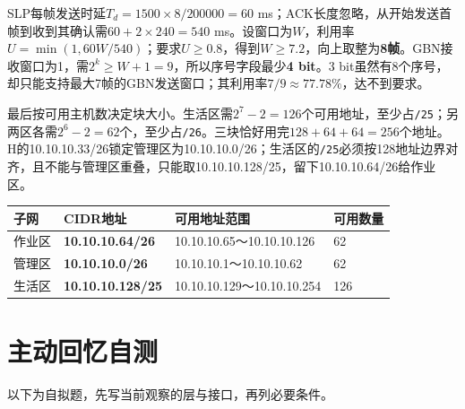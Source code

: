 SLP每帧发送时延\(T_d=1500\times8/200000=60\) ms；ACK长度忽略，从开始发送首帧到收到其确认需\(60+2\times240=540\) ms。设窗口为\(W\)，利用率\(U=\min(1,60W/540)\)；要求\(U\ge0.8\)，得到\(W\ge7.2\)，向上取整为\textbf{8帧}。GBN接收窗口为1，需\(2^k\ge W+1=9\)，所以序号字段最少\textbf{4 bit}。3 bit虽然有8个序号，却只能支持最大7帧的GBN发送窗口；其利用率\(7/9\approx77.78\%\)，达不到要求。

最后按可用主机数决定块大小。生活区需\(2^7-2=126\)个可用地址，至少占\texttt{/\allowbreak{}25}；另两区各需\(2^6-2=62\)个，至少占\texttt{/\allowbreak{}26}。三块恰好用完\(128+64+64=256\)个地址。H的10.10.10.33/26锁定管理区为10.10.10.0/26；生活区的\texttt{/\allowbreak{}25}必须按128地址边界对齐，且不能与管理区重叠，只能取10.10.10.128/25，留下10.10.10.64/26给作业区。

\begin{wideblock}

\par\medskip\noindent\begin{minipage}{\linewidth}\fontsize{9.3}{12}\selectfont\begin{tabularx}{\linewidth}{@{}YYYY@{}}
\toprule\noalign{}
子网 & CIDR地址 & 可用地址范围 & 可用数量 \\
\midrule\noalign{}


作业区 & \textbf{10.10.10.64/26} & 10.10.10.65～10.10.10.126 & 62 \\
管理区 & \textbf{10.10.10.0/26} & 10.10.10.1～10.10.10.62 & 62 \\
生活区 & \textbf{10.10.10.128/25} & 10.10.10.129～10.10.10.254 & 126 \\
\bottomrule\end{tabularx}
\end{minipage}\par\medskip

\end{wideblock}

\section{主动回忆自测}\label{CN04-review}

以下为自拟题，先写当前观察的层与接口，再列必要条件。

